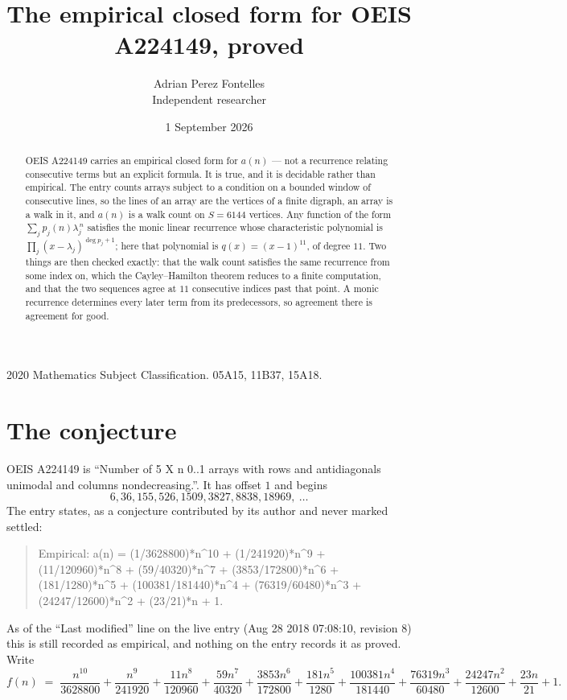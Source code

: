 \documentclass[11pt,a4paper]{article}
\title{The empirical closed form for OEIS A224149, proved}
\author{Adrian Perez Fontelles\\ \small Independent researcher}
\date{1 September 2026}
\theoremstyle{plain}
\theoremstyle{definition}
\begin{document}
\maketitle

\begin{abstract}
OEIS A224149 carries an empirical closed form for $a(n)$ --- not a recurrence relating
consecutive terms but an explicit formula. It is true, and it is decidable rather than
empirical. The entry counts arrays subject to a condition on a bounded window of consecutive lines, so the lines of an array are the
vertices of a finite digraph, an array is a walk in it, and $a(n)$ is a walk count on
$S=6144$ vertices. Any function of the form $\sum_j p_j(n)\lambda_j^{\,n}$ satisfies the
monic linear recurrence whose characteristic polynomial is
$\prod_j(x-\lambda_j)^{\deg p_j+1}$; here that polynomial is $q(x)=(x-1)^{11}$, of degree
$11$. Two things are then checked exactly: that the walk count satisfies the same
recurrence from some index on, which the Cayley--Hamilton theorem reduces to a finite
computation, and that the two sequences agree at $11$ consecutive indices past that
point. A monic recurrence determines every later term from its predecessors, so agreement
there is agreement for good.
\end{abstract}

\noindent\small 2020 Mathematics Subject Classification. 05A15, 11B37, 15A18.\normalsize

\section{The conjecture}

OEIS A224149 is ``Number of 5 X n 0..1 arrays with rows and antidiagonals unimodal and columns nondecreasing.''. It has offset $1$ and begins
\[
6, 36, 155, 526, 1509, 3827, 8838, 18969,\ \dots
\]
The entry states, as a conjecture contributed by its author and never marked settled:
\begin{quote}
Empirical: a(n) = (1/3628800)*n\^{}10 + (1/241920)*n\^{}9 + (11/120960)*n\^{}8 + (59/40320)*n\^{}7 + (3853/172800)*n\^{}6 + (181/1280)*n\^{}5 + (100381/181440)*n\^{}4 + (76319/60480)*n\^{}3 + (24247/12600)*n\^{}2 + (23/21)*n + 1.
\end{quote}
As of the ``Last modified'' line on the live entry (Aug 28 2018 07:08:10, revision 8) this is still
recorded as empirical, and nothing on the entry records it as proved. Write
\[
f(n)\;=\;\frac{n^{10}}{3628800} + \frac{n^{9}}{241920} + \frac{11 n^{8}}{120960} + \frac{59 n^{7}}{40320} + \frac{3853 n^{6}}{172800} + \frac{181 n^{5}}{1280} + \frac{100381 n^{4}}{181440} + \frac{76319 n^{3}}{60480} + \frac{24247 n^{2}}{12600} + \frac{23 n}{21} + 1.
\]
\end{document}
